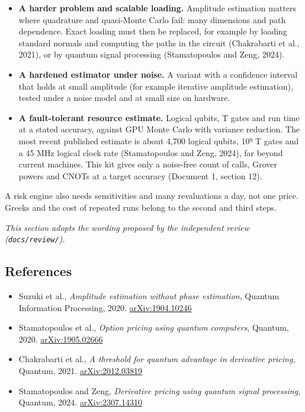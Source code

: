 \documentclass[
  10pt,
]{article}
\providecommand{\tightlist}{%
  \setlength{\itemsep}{0pt}\setlength{\parskip}{0pt}}
\begin{document}
\begin{itemize}
\tightlist
\item
  \textbf{A harder problem and scalable loading.} Amplitude estimation
  matters where quadrature and quasi-Monte Carlo fail: many dimensions
  and path dependence. Exact loading must then be replaced, for example
  by loading standard normals and computing the paths in the circuit
  (Chakrabarti et al., 2021), or by quantum signal processing
  (Stamatopoulos and Zeng, 2024).
\item
  \textbf{A hardened estimator under noise.} A variant with a confidence
  interval that holds at small amplitude (for example iterative
  amplitude estimation), tested under a noise model and at small size on
  hardware.
\item
  \textbf{A fault-tolerant resource estimate.} Logical qubits, T gates
  and run time at a stated accuracy, against GPU Monte Carlo with
  variance reduction. The most recent published estimate is about 4,700
  logical qubits, 10⁹ T gates and a 45 MHz logical clock rate
  (Stamatopoulos and Zeng, 2024), far beyond current machines. This kit
  gives only a noise-free count of calls, Grover powers and CNOTs at a
  target accuracy (Document 1, section 12).
\end{itemize}

A risk engine also needs sensitivities and many revaluations a day, not
one price. Greeks and the cost of repeated runs belong to the second and
third steps.

\emph{This section adopts the wording proposed by the independent review
(\texttt{docs/review/}).}

\hypertarget{references}{%
\subsection{References}\label{references}}

\begin{itemize}
\tightlist
\item
  Suzuki et al., \emph{Amplitude estimation without phase estimation},
  Quantum Information Processing, 2020.
  \href{https://arxiv.org/abs/1904.10246}{arXiv:1904.10246}
\item
  Stamatopoulos et al., \emph{Option pricing using quantum computers},
  Quantum, 2020.
  \href{https://arxiv.org/abs/1905.02666}{arXiv:1905.02666}
\item
  Chakrabarti et al., \emph{A threshold for quantum advantage in
  derivative pricing}, Quantum, 2021.
  \href{https://arxiv.org/abs/2012.03819}{arXiv:2012.03819}
\item
  Stamatopoulos and Zeng, \emph{Derivative pricing using quantum signal
  processing}, Quantum, 2024.
  \href{https://arxiv.org/abs/2307.14310}{arXiv:2307.14310}
\end{itemize}
\end{document}
